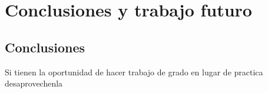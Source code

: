 \chapter{Conclusiones y trabajo futuro}\label{chap:conclusiones}
\section{Conclusiones}
Si tienen la oportunidad de hacer trabajo de grado en lugar de practica desaprovechenla
